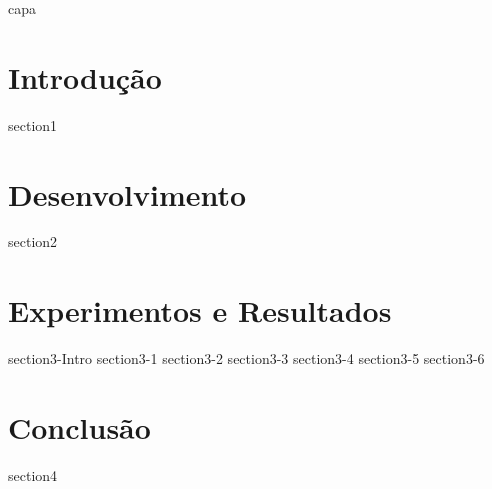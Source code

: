 \documentclass[11pt,a4paper]{article}
\begin{document}
    {capa} 
    \myemptypage %
    \thispagestyle{empty}
    \listoffigures
    \listoftables
    \newpage
    \tableofcontents
    \newpage
    \setlength{\parindent}{0cm}
    \section{Introdução}
        {section1}
    \section{Desenvolvimento}
        {section2}
    \section{Experimentos e Resultados}
        {section3-Intro}
        {section3-1}
        {section3-2}
        {section3-3}
        {section3-4}
        {section3-5}
        {section3-6}
    \section{Conclusão}
        {section4}
\end{document}
